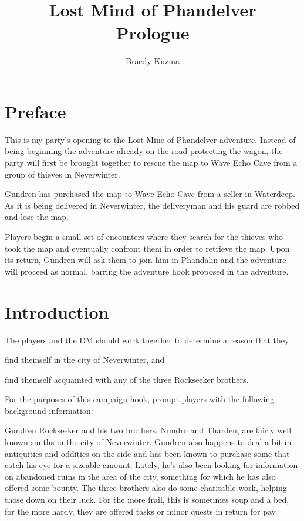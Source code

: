 \documentclass[10pt,twocolumn,openany,nodeprecatedcode,bg=none,inline]{dndbook}
\title{\DndFontChapter Lost Mind of Phandelver \\ \DndFontSection \centering Prologue}
\author{\DndFontSubsection Braedy Kuzma}
\date{}
\makeatletter
\renewcommand\mainmatter{\clearpage\@mainmattertrue\pagenumbering{arabic}}
\makeatother
\begin{document}
\frontmatter%

\maketitle

\chapter*{Preface}
This is my party's opening to the Lost Mine of Phandelver adventure.
Instead of being beginning the adventure already on the road protecting the wagon, the party will first be brought together to rescue the map to Wave Echo Cave from a group of thieves in Neverwinter.

Gundren has purchased the map to Wave Echo Cave from a seller in Waterdeep.
As it is being delivered in Neverwinter, the deliveryman and his guard are robbed and lose the map.

Players begin a small set of encounters where they search for the thieves who took the map and eventually confront them in order to retrieve the map.
Upon its return, Gundren will ask them to join him in Phandalin and the adventure will proceed as normal, barring the adventure hook proposed in the adventure.

\tableofcontents

\nopagebreak
\mainmatter%

\chapter{Introduction}
The players and the DM should work together to determine a reason that they
\begin{enumerate*}[label={(\arabic*)}]
  \item find themself in the city of Neverwinter, and
  \item find themself acquainted with any of the three Rockseeker brothers.
\end{enumerate*}

For the purposes of this campaign hook, prompt players with the following background information:
\begin{DndReadAloud}
  Gundren Rockseeker and his two brothers, Nundro and Tharden, are fairly well known smiths in the city of Neverwinter.
  Gundren also happens to deal a bit in antiquities and oddities on the side and has been known to purchase some that catch his eye for a sizeable amount.
  Lately, he's also been looking for information on abandoned ruins in the area of the city, something for which he has also offered some bounty.
  The three brothers also do some charitable work, helping those down on their luck.
  For the more frail, this is sometimes soup and a bed, for the more hardy, they are offered tasks or minor quests in return for pay.
\end{DndReadAloud}
\end{document}
